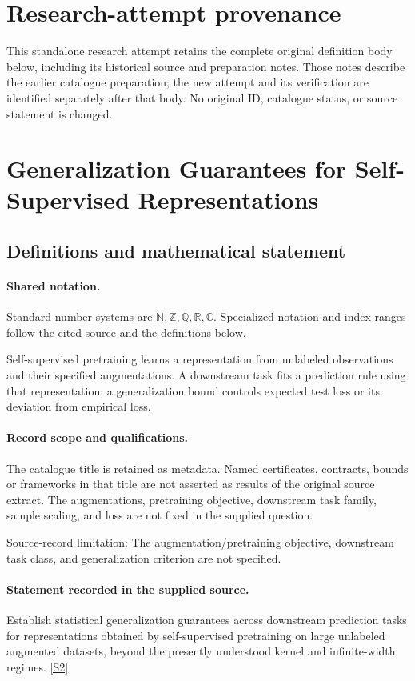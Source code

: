 \documentclass[11pt]{article}
\begin{document}
\section*{Research-attempt provenance}
This standalone research attempt retains the complete original definition body below,
including its historical source and preparation notes. Those notes describe the
earlier catalogue preparation; the new attempt and its verification are identified
separately after that body. No original ID, catalogue status, or source statement is changed.

\section{Generalization Guarantees for Self-Supervised Representations}\label{statement}

\subsection{Definitions and mathematical statement}

\paragraph{Shared notation.}Standard number systems are $\mathbb N,\mathbb Z,\mathbb Q,\mathbb R,\mathbb C$. Specialized notation and index ranges follow the cited source and the definitions below.


Self-supervised pretraining learns a representation from unlabeled observations and their specified augmentations. A downstream task fits a prediction rule using that representation; a generalization bound controls expected test loss or its deviation from empirical loss.
\paragraph{Record scope and qualifications.}
The catalogue title is retained as metadata. Named certificates, contracts, bounds or frameworks in that title are not asserted as results of the original source extract.
The augmentations, pretraining objective, downstream task family, sample scaling, and loss are not fixed in the supplied question.

Source-record limitation: The augmentation/pretraining objective, downstream task class, and generalization criterion are not specified.
\paragraph{Statement recorded in the supplied source.}
Establish statistical generalization guarantees across downstream prediction tasks for representations obtained by self-supervised pretraining on large unlabeled augmented datasets, beyond the presently understood kernel and infinite-width regimes. \href{https://doi.org/10.4171/owr/2025/4}{[S2]}
\end{document}
